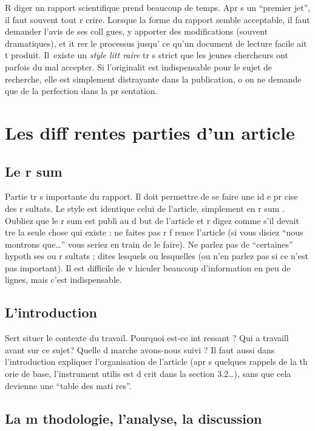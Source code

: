 \documentclass{article}
\begin{document}
R diger un rapport scientifique prend beaucoup de temps. Apr s un 
``premier jet'', il faut souvent tout r crire. 
Lorsque la forme du rapport semble acceptable, il faut demander l'avis 
de ses coll gues, y apporter des modifications (souvent dramatiques), 
et it rer le processus
jusqu'  ce qu'un document de lecture facile ait  t  produit. Il~existe 
un \emph{style litt raire\/} tr s strict que les jeunes chercheurs ont parfois 
du mal   accepter. Si l'originalit  est indispensable pour le sujet de 
recherche, elle est simplement distrayante dans la publication,
o  on ne demande que de la perfection dans la pr \-sen\-ta\-tion.


\section{Les diff rentes parties d'un article}


\subsection{Le r sum }

Partie tr s importante du rapport.
Il doit permettre de se faire une id e pr cise des r sultats.
Le style est identique   celui de l'article, simplement en r sum .
Oubliez que le r sum  est publi  au d but de l'article et r digez 
comme s'il devait  tre la seule chose qui existe : ne faites pas 
r f rence   l'article (si vous disiez ``nous montrons que\dots'' 
vous seriez en train de le faire). 
Ne parlez pas de ``certaines'' hypoth ses ou r sultats ; dites lesquels 
ou lesquelles (ou n'en parlez pas si ce n'est pas important). Il est difficile de v hiculer beaucoup 
d'information en peu de lignes, mais c'est indispensable.


\subsection{L'introduction}

Sert   situer le contexte du travail. Pourquoi est-ce int ressant ? 
Qui a travaill  avant sur ce sujet? Quelle d marche avons-nous suivi ?
Il faut aussi dans l'introduction expliquer l'organisation de l'article 
(apr s quelques rappels de la th orie de base,  l'instrument 
utilis  est d crit dans la section 3.2\dots), sans que cela 
devienne une ``table des mati res''.


\subsection{La m thodologie, l'analyse, la discussion}
\end{document}
